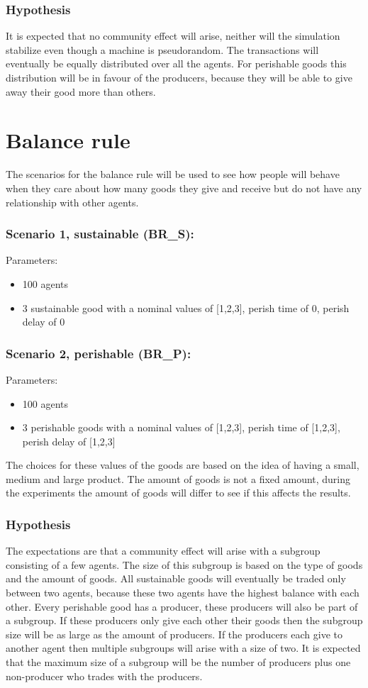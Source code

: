 \documentclass[twoside,openright]{uva-bachelor-thesis}
\begin{document}
\subsubsection{Hypothesis}
It is expected that no community effect will arise, neither will the simulation stabilize even though a machine is pseudorandom. The transactions will eventually be equally distributed over all the agents. For perishable goods this distribution will be in favour of the producers, because they will be able to give away their good more than others.

\section{Balance rule}
The scenarios for the balance rule will be used to see how people will behave when they care about how many goods they give and receive but do not have any relationship with other agents.
\subsubsection{Scenario 1, sustainable (BR\_S):}
Parameters:
\begin{itemize}
\item	100 agents
\item	3 sustainable good with a nominal values of [1,2,3], perish time of 0, perish delay of 0
\end{itemize}
\subsubsection{Scenario 2, perishable (BR\_P):}
Parameters:
\begin{itemize}
\item	100 agents
\item	3 perishable goods with a nominal values of [1,2,3], perish time of [1,2,3], perish delay of [1,2,3]
\end{itemize}
The choices for these values of the goods are based on the idea of having a small, medium and large product. The amount of goods is not a fixed amount, during the experiments the amount of goods will differ to see if this affects the results.

\subsubsection{Hypothesis}
The expectations are that a community effect will arise with a subgroup consisting of a few agents. The size of this subgroup is based on the type of goods and the amount of goods. All sustainable goods will eventually be traded only between two agents, because these two agents have the highest balance with each other. Every perishable good has a producer, these producers will also be part of a subgroup. If these producers only give each other their goods then the subgroup size will be as large as the amount of producers. If the producers each give to another agent then multiple subgroups will arise with a size of two. It is expected that the maximum size of a subgroup will be the number of producers plus one non-producer who trades with the producers.
\end{document}
